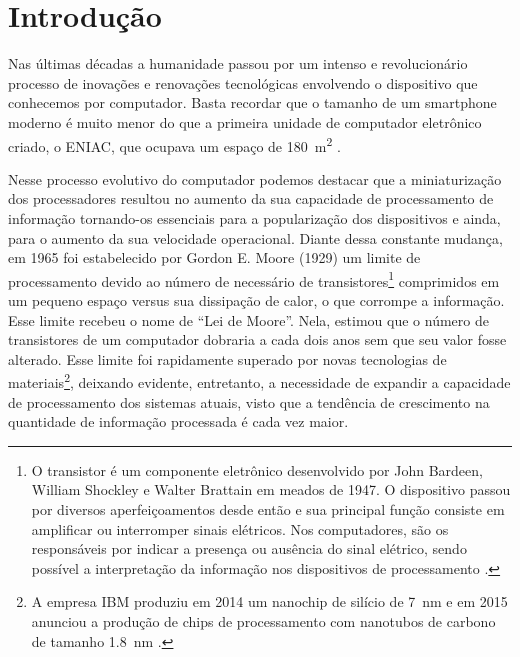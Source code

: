 \chapter{Introdução}

Nas últimas décadas a humanidade passou por um intenso e revolucionário processo de inovações e renovações tecnológicas envolvendo o dispositivo que conhecemos por computador. Basta recordar que o tamanho de um smartphone moderno é muito menor do que a primeira unidade de computador eletrônico criado, o ENIAC, que ocupava um espaço de \SI{180}{\square\meter} \cite{eniac}.


Nesse processo evolutivo do computador podemos destacar que a miniaturização dos processadores resultou no aumento da sua capacidade de processamento de informação tornando-os essenciais para a popularização dos dispositivos e ainda, para o aumento da sua velocidade operacional. Diante dessa constante mudança, em 1965 foi estabelecido por Gordon E. Moore (1929) um limite de processamento devido ao número de necessário de transistores\footnote{O transistor é um componente eletrônico desenvolvido por John Bardeen, William Shockley e Walter Brattain em meados de 1947. O dispositivo passou por diversos aperfeiçoamentos desde então e sua principal função consiste em amplificar ou interromper sinais elétricos. Nos computadores, são os responsáveis por indicar a presença ou ausência do sinal elétrico, sendo possível a interpretação da informação nos dispositivos de processamento \cite{transistor}.} comprimidos em um pequeno espaço versus sua dissipação de calor, o que corrompe a informação. Esse limite recebeu o nome de ``Lei de Moore''. Nela, \textcite{moore} estimou que o número de transistores de um computador dobraria a cada dois anos sem que seu valor fosse alterado. Esse limite foi rapidamente superado por novas tecnologias de materiais\footnote{A empresa IBM produziu em 2014 um nanochip de silício de \SI{7}{\nano\meter} e em 2015 anunciou a produção de chips de processamento com nanotubos de carbono de tamanho \SI{1.8}{\nano\meter} \cite{chipibm}.}, deixando evidente, entretanto, a necessidade de expandir a capacidade de processamento dos sistemas atuais, visto que a tendência de crescimento na quantidade de informação processada é cada vez maior.

